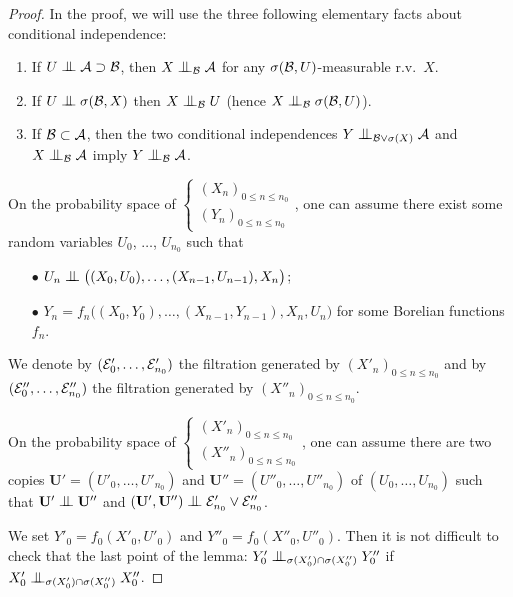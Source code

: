 \documentclass[12pt,a4paper]{article}
\begin{document}
\begin{proof}
In the proof, we will use the three following elementary facts about 
conditional independence:
\begin{enumerate}[{\it(i)}]
\item If $U \indep {\cal A} \supset {\cal B}$, 
then $X \indep_\BB {\cal A}$ for any $\sigma({\cal B}, U)$-measurable r.v.\ $X$.

\item If $U \indep \sigma({\cal B}, X)$ then $X \indep_\BB U$ (hence $X \indep_\BB \sigma({\cal B}, U)$).

\item If $\mathcal{B} \subset {\cal A}$, then 
the two conditional independences $Y \indep_{\BB \vee \sigma(X)} {\cal A}$
and $X \indep_{\BB} {\cal A}$ imply $Y \indep_{\BB} {\cal A}$.
\end{enumerate}

On the probability space of $\left\{\begin{smallmatrix} {(X_n)}_{0 \leq n \leq n_0} \\ 
{(Y_n)}_{0 \leq n \leq n_0}
\end{smallmatrix}\right.$, one can assume there exist some random variables 
$U_0$, $\ldots$, $U_{n_0}$ such that 
\begin{itemize}
\item[$\bullet$] $U_n \indep \bigl((X_0,U_0), \ldots, (X_{n-1}, U_{n-1}), X_n\bigr)$;

\item[$\bullet$] $Y_n = f_n\bigl((X_0,Y_0), \ldots, (X_{n-1}, Y_{n-1}), X_n, U_n\bigr)$   
for some Borelian functions $f_n$. 
\end{itemize}

We denote by $(\mathcal{E}'_0, \ldots, \mathcal{E}'_{n_0})$ the filtration generated by 
${(X'_n)}_{0 \leq n \leq n_0}$ and by $(\mathcal{E}''_0, \ldots, \mathcal{E}''_{n_0})$ 
the filtration generated by ${(X''_n)}_{0 \leq n \leq n_0}$. 

On the probability space of $\left\{\begin{smallmatrix} {(X'_n)}_{0 \leq n \leq n_0} \\ 
{(X''_n)}_{0 \leq n \leq n_0}
\end{smallmatrix}\right.$, one can assume there are two copies 
$\mathbf{U}'=(U'_0, \ldots, U'_{n_0})$ and $\mathbf{U}''=(U''_0, \ldots, U''_{n_0})$ of 
$(U_0, \ldots, U_{n_0})$ such that $\mathbf{U}' \indep \mathbf{U}''$ and 
$(\mathbf{U}',\mathbf{U}'') \indep \EEE'_{n_0} \vee \EEE''_{n_0}$. 

We set $Y'_0 = f_0(X'_0, U'_0)$ and $Y''_0 = f_0(X''_0, U''_0)$. 
Then it is not difficult to check that 
the last point of the lemma:  
 $Y'_0 \indep_{\sigma(X'_0)\cap\sigma(X''_0)} Y''_0$
if  $X'_0 \indep_{\sigma(X'_0)\cap\sigma(X''_0)} X''_0$.  



\end{proof}
\end{document}
